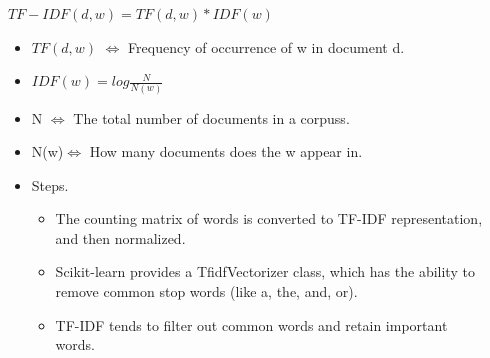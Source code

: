 \documentclass{tikzposter} %
\begin{document}
\begin{columns}
{\begin{itemize}
        \vspace{1.2cm}
        
        \begin{centering}
         
        $ TF-IDF (d, w) = TF (d, w) *IDF(w)$
        
        
        \end{centering}
        
        \begin{itemize}
        
        \item
        $TF(d,w)$ $\Leftrightarrow$ Frequency of occurrence of w in document d.
        \item
        $IDF(w) = log\frac{N}{N(w)}$
        \item
        N $\Leftrightarrow$ The total number of documents in a corpuss.
        \item
        N(w)$\Leftrightarrow$ How many documents does the w appear in.
        \end{itemize}
        \begin{itemize}
            \item
            Steps.
            
            \begin{itemize}
            \item
            The counting matrix of words is converted to TF-IDF representation, and then normalized.
            \item
            Scikit-learn provides a TfidfVectorizer class, which has the ability to remove common stop words (like a, the, and, or).
            \item
            TF-IDF tends to filter out common words and retain important words.
            
           
            \end{itemize}
        \end{itemize}
\end{itemize}

}


{
    \begin{itemize}
    

\end{itemize}}
\end{columns}
\end{document}
